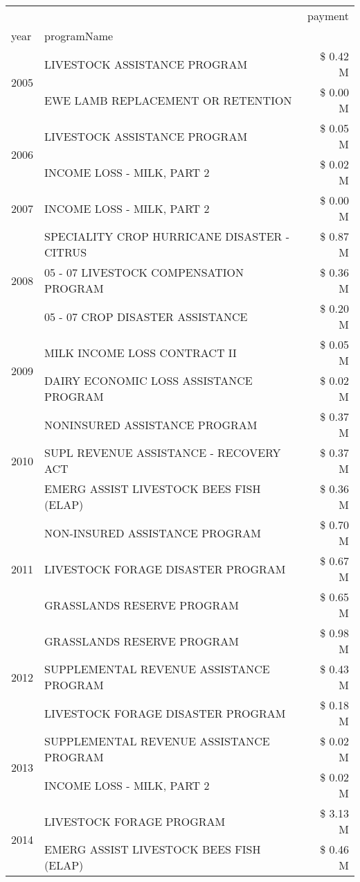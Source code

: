 \begin{tabular}{llr}
\toprule
 &  & payment \\
year & programName &  \\
\midrule
\multirow[t]{2}{*}{2005} & LIVESTOCK ASSISTANCE PROGRAM & \$ 0.42 M \\
 & EWE LAMB REPLACEMENT OR RETENTION & \$ 0.00 M \\
\cline{1-3}
\multirow[t]{2}{*}{2006} & LIVESTOCK ASSISTANCE PROGRAM & \$ 0.05 M \\
 & INCOME LOSS - MILK, PART 2 & \$ 0.02 M \\
\cline{1-3}
2007 & INCOME LOSS - MILK, PART 2 & \$ 0.00 M \\
\cline{1-3}
\multirow[t]{3}{*}{2008} & SPECIALITY CROP HURRICANE DISASTER - CITRUS & \$ 0.87 M \\
 & 05 - 07 LIVESTOCK COMPENSATION PROGRAM & \$ 0.36 M \\
 & 05 - 07 CROP DISASTER ASSISTANCE & \$ 0.20 M \\
\cline{1-3}
\multirow[t]{2}{*}{2009} & MILK INCOME LOSS CONTRACT II & \$ 0.05 M \\
 & DAIRY ECONOMIC LOSS ASSISTANCE PROGRAM & \$ 0.02 M \\
\cline{1-3}
\multirow[t]{3}{*}{2010} & NONINSURED ASSISTANCE PROGRAM & \$ 0.37 M \\
 & SUPL REVENUE ASSISTANCE - RECOVERY ACT & \$ 0.37 M \\
 & EMERG ASSIST LIVESTOCK BEES FISH (ELAP) & \$ 0.36 M \\
\cline{1-3}
\multirow[t]{3}{*}{2011} & NON-INSURED ASSISTANCE PROGRAM & \$ 0.70 M \\
 & LIVESTOCK FORAGE DISASTER PROGRAM & \$ 0.67 M \\
 & GRASSLANDS RESERVE PROGRAM & \$ 0.65 M \\
\cline{1-3}
\multirow[t]{3}{*}{2012} & GRASSLANDS RESERVE PROGRAM & \$ 0.98 M \\
 & SUPPLEMENTAL REVENUE ASSISTANCE PROGRAM & \$ 0.43 M \\
 & LIVESTOCK FORAGE DISASTER PROGRAM & \$ 0.18 M \\
\cline{1-3}
\multirow[t]{2}{*}{2013} & SUPPLEMENTAL REVENUE ASSISTANCE PROGRAM & \$ 0.02 M \\
 & INCOME LOSS - MILK, PART 2 & \$ 0.02 M \\
\cline{1-3}
\multirow[t]{2}{*}{2014} & LIVESTOCK FORAGE PROGRAM & \$ 3.13 M \\
 & EMERG ASSIST LIVESTOCK BEES FISH (ELAP) & \$ 0.46 M \\

\end{tabular}
